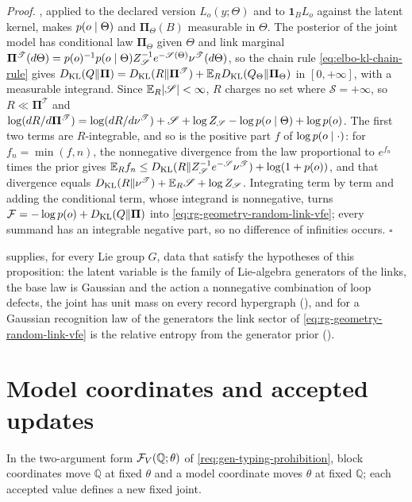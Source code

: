 \noindent\emph{Proof.}
, applied to the declared version
$L_o(y;\Theta)$ and to $\mathbf 1_BL_o$ against the latent kernel, makes
$p(o\mid\Theta)$ and $\boldsymbol\Pi_\Theta(B)$ measurable in $\Theta$. The
posterior of the joint model has conditional law $\boldsymbol\Pi_\Theta$
given $\Theta$ and link marginal
$\boldsymbol\Pi^{\mathscr T}(d\Theta)
=p(o)^{-1}p(o\mid\Theta)Z_{\mathscr S}^{-1}e^{-\mathscr S(\Theta)}\nu^{\mathscr T}(d\Theta)$,
so the chain rule
\eqref{eq:elbo-kl-chain-rule} gives
$D_{\mathrm{KL}}(Q\Vert\boldsymbol\Pi)=D_{\mathrm{KL}}(R\Vert\boldsymbol\Pi^{\mathscr T})+\mathbb E_RD_{\mathrm{KL}}(Q_\Theta\Vert\boldsymbol\Pi_\Theta)$
in $[0,+\infty]$, with a measurable integrand. Since
$\mathbb E_R\lvert\mathscr S\rvert<\infty$, $R$ charges no set where
$\mathscr S=+\infty$, so $R\ll\boldsymbol\Pi^{\mathscr T}$ and
$\log(dR/d\boldsymbol\Pi^{\mathscr T})=\log(dR/d\nu^{\mathscr T})+\mathscr S+\log Z_{\mathscr S}
-\log p(o\mid\Theta)+\log p(o)$. The first two terms are $R$-integrable, and so
is the positive part $f$ of $\log p(o\mid\cdot)$: for $f_n=\min(f,n)$, the
nonnegative divergence from the law proportional to $e^{f_n}$ times the prior
gives $\mathbb E_Rf_n\leq D_{\mathrm{KL}}(R\Vert Z_{\mathscr S}^{-1}e^{-\mathscr S}\nu^{\mathscr T})+\log(1+p(o))$,
and that divergence equals
$D_{\mathrm{KL}}(R\Vert\nu^{\mathscr T})+\mathbb E_R\mathscr S+\log Z_{\mathscr S}$. Integrating
term by term and adding the conditional term, whose integrand is nonnegative,
turns $\mathcal F=-\log p(o)+D_{\mathrm{KL}}(Q\Vert\boldsymbol\Pi)$ into
\eqref{eq:rg-geometry-random-link-vfe}; every summand has an integrable negative
part, so no difference of infinities occurs. \hfill$\square$

 supplies, for every Lie group $G$, data that satisfy the hypotheses of this proposition:
the latent variable is the family of Lie-algebra generators of the links, the base law is Gaussian and
the action a nonnegative combination of loop defects, the joint has unit mass on every record hypergraph
(), and for a Gaussian recognition law of the generators the link
sector of
\eqref{eq:rg-geometry-random-link-vfe} is the relative entropy from the generator prior
().

\section{Model coordinates and accepted updates}
\label{sec:elbo-coordinates}

In the two-argument form $\mathcal F_V(\mathbb Q;\theta)$ of
\cref{req:gen-typing-prohibition}, block coordinates move $\mathbb Q$ at fixed
$\theta$ and a model coordinate moves $\theta$ at fixed $\mathbb Q$; each
accepted value defines a new fixed joint.

